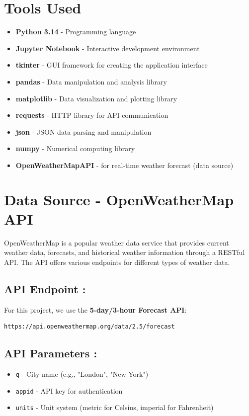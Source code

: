 \documentclass[a4paper]{article}
\begin{document}
\section*{Tools Used}
\begin{itemize}
    \item \textbf{Python 3.14} - Programming language
    \item \textbf{Jupyter Notebook} - Interactive development environment
    \item \textbf{tkinter} - GUI framework for creating the application interface
    \item \textbf{pandas} - Data manipulation and analysis library
    \item \textbf{matplotlib} - Data visualization and plotting library
    \item \textbf{requests} - HTTP library for API communication
    \item \textbf{json} - JSON data parsing and manipulation
    \item \textbf{numpy} - Numerical computing library
    \item \textbf{OpenWeatherMapAPI} - for real-time weather forecast (data source)
\end{itemize}

\vspace{10pt}

\section*{Data Source - OpenWeatherMap API}

OpenWeatherMap is a popular weather data service that provides current weather data, forecasts, and historical weather information through a RESTful API. The API offers various endpoints for different types of weather data.

\subsection*{API Endpoint :}
For this project, we use the \textbf{5-day/3-hour Forecast API}:
\begin{verbatim}
https://api.openweathermap.org/data/2.5/forecast
\end{verbatim}

\subsection*{API Parameters :}
\begin{itemize}
    \item \texttt{q} - City name (e.g., "London", "New York")
    \item \texttt{appid} - API key for authentication
    \item \texttt{units} - Unit system (metric for Celsius, imperial for Fahrenheit)
\end{itemize}
\end{document}
